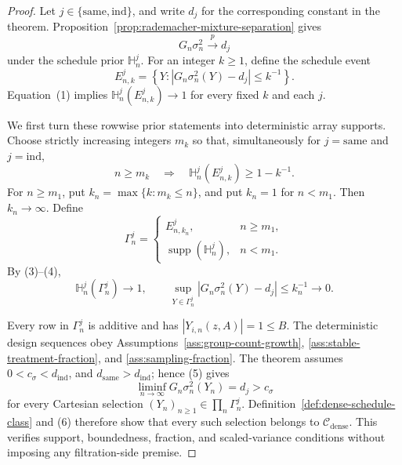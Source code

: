 \documentclass{article}
\begin{document}
\begin{proof}
Let \(j\in\{\mathrm{same},\mathrm{ind}\}\), and write \(d_j\) for the corresponding constant in the theorem. Proposition~\ref{prop:rademacher-mixture-separation} gives
\[
G_n\sigma_n^2\xrightarrow{p}d_j
\tag{1}
\]
under the schedule prior \(\mathbb H_n^j\). For an integer \(k\ge1\), define the schedule event
\[
E_{n,k}^j=
\left\{Y:\left|G_n\sigma_n^2(Y)-d_j\right|\le k^{-1}\right\}.
\tag{2}
\]
Equation~(1) implies \(\mathbb H_n^j(E_{n,k}^j)\to1\) for every fixed \(k\) and each \(j\).

We first turn these rowwise prior statements into deterministic array supports. Choose strictly increasing integers \(m_k\) so that, simultaneously for \(j=\mathrm{same}\) and \(j=\mathrm{ind}\),
\[
n\ge m_k
\quad\Longrightarrow\quad
\mathbb H_n^j(E_{n,k}^j)\ge1-k^{-1}.
\tag{3}
\]
For \(n\ge m_1\), put \(k_n=\max\{k:m_k\le n\}\), and put \(k_n=1\) for \(n<m_1\). Then \(k_n\to\infty\). Define
\[
\Gamma_n^j=
\begin{cases}
E_{n,k_n}^j,&n\ge m_1,\\
\operatorname{supp}(\mathbb H_n^j),&n<m_1.
\end{cases}
\tag{4}
\]
By (3)--(4),
\[
\mathbb H_n^j(\Gamma_n^j)\longrightarrow1,
\qquad
\sup_{Y\in\Gamma_n^j}
\left|G_n\sigma_n^2(Y)-d_j\right|\le k_n^{-1}\longrightarrow0.
\tag{5}
\]

Every row in \(\Gamma_n^j\) is additive and has \(|Y_{i,n}(z,A)|=1\le B\). The deterministic design sequences obey Assumptions~\ref{ass:group-count-growth}, \ref{ass:stable-treatment-fraction}, and \ref{ass:sampling-fraction}. The theorem assumes \(0<c_\sigma<d_{\mathrm{ind}}\), and \(d_{\mathrm{same}}>d_{\mathrm{ind}}\); hence (5) gives
\[
\liminf_{n\to\infty}G_n\sigma_n^2(Y_n)=d_j>c_\sigma
\tag{6}
\]
for every Cartesian selection \((Y_n)_{n\ge1}\in\prod_n\Gamma_n^j\). Definition~\ref{def:dense-schedule-class} and (6) therefore show that every such selection belongs to \(\mathcal C_{\mathrm{dense}}\). This verifies support, boundedness, fraction, and scaled-variance conditions without imposing any filtration-side premise.


\end{proof}
\end{document}
